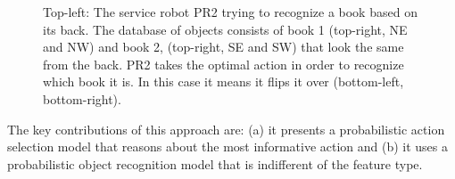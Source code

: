 \begin{figure}[ht]
\begin{tabular}{cccc}
    \end{tabular}
    \caption{Top-left: The service robot PR2 trying to recognize a book based on its back. The database of objects consists of book 1 (top-right, NE and NW) and book 2, (top-right, SE and SW) that look the same from the back. PR2 takes the optimal action in order to recognize which book it is. In this case it means it flips it over (bottom-left, bottom-right).}
    \vspace{-4ex}

    \label{fig:pr2}
    \end{figure}

The key contributions of this approach are: (a) it presents a probabilistic action selection model that reasons about the most informative action and (b) it uses a probabilistic object recognition model that is indifferent of the feature type.


